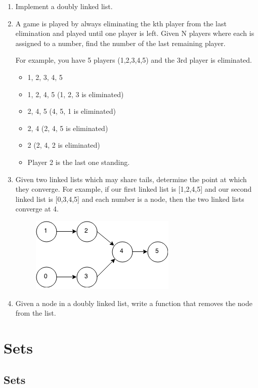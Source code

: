 \documentclass[11pt,oneside]{book}
\makeatletter
\def\maxwidth#1{\ifdim\Gin@nat@width>#1 #1\else\Gin@nat@width\fi}
\makeatother
\begin{document}
\begin{enumerate}
\item Implement a doubly linked list.
\item A game is played by always eliminating the kth player from the last elimination and played until one player is left. Given N players where each is assigned to a number, find the number of the last remaining player.

For example, you have 5 players (1,2,3,4,5) and the 3rd player is eliminated.

\begin{itemize}
\item 1, 2, 3, 4, 5 
\item 1, 2, 4, 5 (1, 2, 3 is eliminated)
\item 2, 4, 5 (4, 5, 1 is eliminated)
\item 2, 4 (2, 4, 5 is eliminated)
\item 2 (2, 4, 2 is eliminated)
\item Player 2 is the last one standing.
\end{itemize}
\item Given two linked lists which may share tails, determine the point at which they converge. For example, if our first linked list is [1,2,4,5] and our second linked list is [0,3,4,5] and each number is a node, then the two linked lists converge at 4. 
\vspace{5px}\begin{figure}[H]\centering
        \includegraphics[width=0.66\maxwidth{\textwidth}]{linkedlistconverge.png}
        \end{figure}
\item Given a node in a doubly linked list, write a function that removes the node from the list. 
\end{enumerate}

    \chapter{ Sets }
        \section{ Sets }
        
\end{document}
